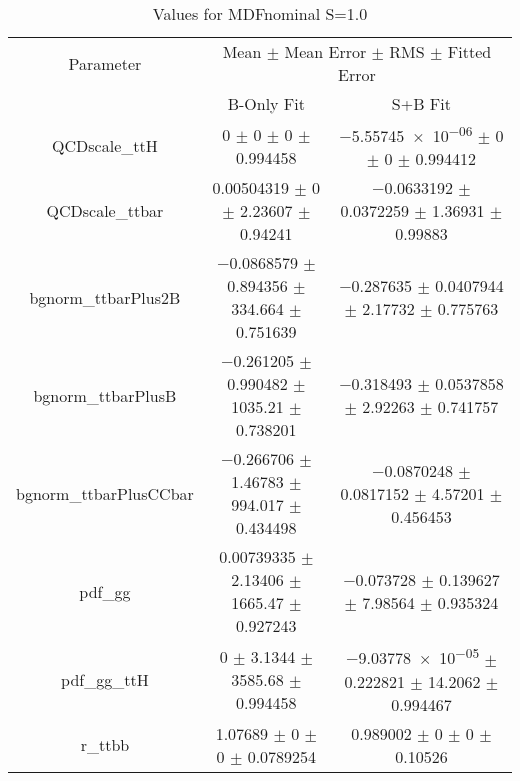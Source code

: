 \begin{table}
\centering
\caption{Values for MDFnominal S=1.0}
\begin{tabular}{ccc}
\toprule
Parameter & \multicolumn{2}{c}{Mean $\pm$ Mean Error $\pm$ RMS $\pm$ Fitted Error}\\
 & B-Only Fit & S+B Fit\\
\midrule
QCDscale\_ttH & \num{0} $\pm$ \num{0} $\pm$ \num{0} $\pm$ \num{0.994458} & \num{-5.55745e-06} $\pm$ \num{0} $\pm$ \num{0} $\pm$ \num{0.994412}\\
QCDscale\_ttbar & \num{0.00504319} $\pm$ \num{0} $\pm$ \num{2.23607} $\pm$ \num{0.94241} & \num{-0.0633192} $\pm$ \num{0.0372259} $\pm$ \num{1.36931} $\pm$ \num{0.99883}\\
bgnorm\_ttbarPlus2B & \num{-0.0868579} $\pm$ \num{0.894356} $\pm$ \num{334.664} $\pm$ \num{0.751639} & \num{-0.287635} $\pm$ \num{0.0407944} $\pm$ \num{2.17732} $\pm$ \num{0.775763}\\
bgnorm\_ttbarPlusB & \num{-0.261205} $\pm$ \num{0.990482} $\pm$ \num{1035.21} $\pm$ \num{0.738201} & \num{-0.318493} $\pm$ \num{0.0537858} $\pm$ \num{2.92263} $\pm$ \num{0.741757}\\
bgnorm\_ttbarPlusCCbar & \num{-0.266706} $\pm$ \num{1.46783} $\pm$ \num{994.017} $\pm$ \num{0.434498} & \num{-0.0870248} $\pm$ \num{0.0817152} $\pm$ \num{4.57201} $\pm$ \num{0.456453}\\
pdf\_gg & \num{0.00739335} $\pm$ \num{2.13406} $\pm$ \num{1665.47} $\pm$ \num{0.927243} & \num{-0.073728} $\pm$ \num{0.139627} $\pm$ \num{7.98564} $\pm$ \num{0.935324}\\
pdf\_gg\_ttH & \num{0} $\pm$ \num{3.1344} $\pm$ \num{3585.68} $\pm$ \num{0.994458} & \num{-9.03778e-05} $\pm$ \num{0.222821} $\pm$ \num{14.2062} $\pm$ \num{0.994467}\\
r\_ttbb & \num{1.07689} $\pm$ \num{0} $\pm$ \num{0} $\pm$ \num{0.0789254} & \num{0.989002} $\pm$ \num{0} $\pm$ \num{0} $\pm$ \num{0.10526}\\
\bottomrule
\end{tabular}
\end{table}